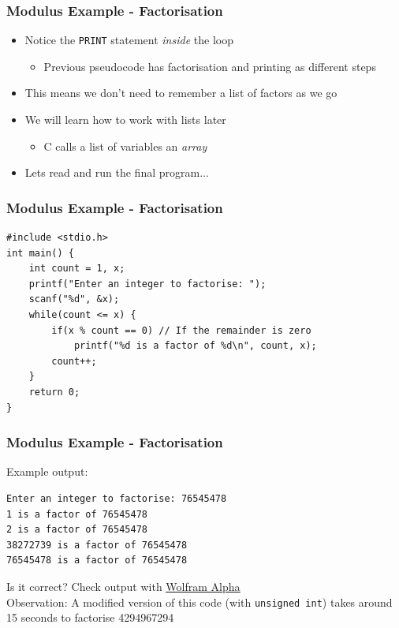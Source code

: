 \documentclass[14pt]{beamer}
\begin{document}
\begin{frame}
\frametitle{Modulus Example - Factorisation}
\begin{itemize}
\item Notice the \texttt{PRINT} statement \textit{inside} the loop
	\begin{itemize}
		\item Previous pseudocode has factorisation and printing as different steps
	\end{itemize}
\item This means we don't need to remember a list of factors as we go
\item We will learn how to work with lists later
	\begin{itemize}
		\item C calls a list of variables an \textit{array}
	\end{itemize}
\item Lets read and run the final program...
\end{itemize}
\end{frame}

\begin{frame}[fragile]
\frametitle{Modulus Example - Factorisation}
\begin{lstlisting}[style=CStyle,basicstyle=\ttfamily\footnotesize,caption=\texttt{factors.c}]
#include <stdio.h>
int main() {
	int count = 1, x;
	printf("Enter an integer to factorise: ");
	scanf("%d", &x);
	while(count <= x) {
		if(x % count == 0) // If the remainder is zero
			printf("%d is a factor of %d\n", count, x);
		count++;
	}
	return 0;
}
\end{lstlisting}
\end{frame}

\begin{frame}[fragile]
\frametitle{Modulus Example - Factorisation}
Example output:
\begin{lstlisting}[style=pseudo]
Enter an integer to factorise: 76545478
1 is a factor of 76545478
2 is a factor of 76545478
38272739 is a factor of 76545478
76545478 is a factor of 76545478
\end{lstlisting}

Is it correct? Check output with \underline{\href{https://www.wolframalpha.com/input/?i=factors+of+76545478}{Wolfram Alpha}}
\\
\vspace{5mm}
Observation: A modified version of this code (with \texttt{unsigned int}) takes around 15 seconds to factorise 4294967294
\end{frame}
\end{document}
